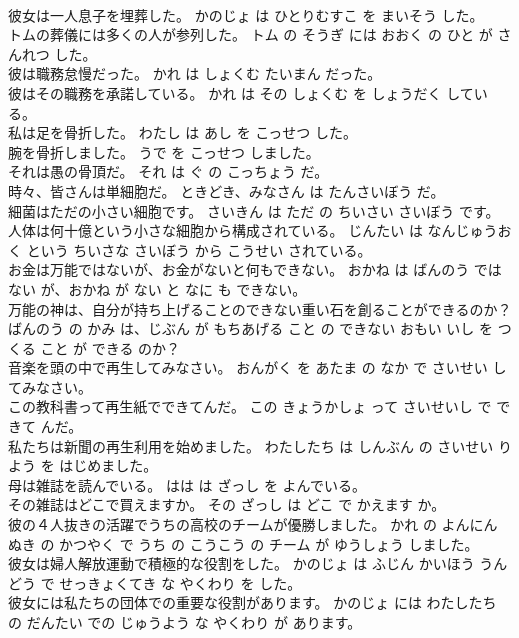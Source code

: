 \documentclass[8pt]{extreport}
\begin{document}
\begin{CJK}{UTF8}{min}
\\	彼女は一人息子を埋葬した。	かのじょ は ひとりむすこ を まいそう した。	
\\	トムの葬儀には多くの人が参列した。	トム の そうぎ には おおく の ひと が さんれつ した。	
\\	彼は職務怠慢だった。	かれ は しょくむ たいまん だった。	
\\	彼はその職務を承諾している。	かれ は その しょくむ を しょうだく している。	
\\	私は足を骨折した。	わたし は あし を こっせつ した。	
\\	腕を骨折しました。	うで を こっせつ しました。	
\\	それは愚の骨頂だ。	それ は ぐ の こっちょう だ。	
\\	時々、皆さんは単細胞だ。	ときどき、みなさん は たんさいぼう だ。	
\\	細菌はただの小さい細胞です。	さいきん は ただ の ちいさい さいぼう です。	
\\	人体は何十億という小さな細胞から構成されている。	じんたい は なんじゅうおく という ちいさな さいぼう から こうせい されている。	
\\	お金は万能ではないが、お金がないと何もできない。	おかね は ばんのう では ない が、おかね が ない と なに も できない。	
\\	万能の神は、自分が持ち上げることのできない重い石を創ることができるのか？	ばんのう の かみ は、じぶん が もちあげる こと の できない おもい いし を つくる こと が できる のか？	
\\	音楽を頭の中で再生してみなさい。	おんがく を あたま の なか で さいせい してみなさい。	
\\	この教科書って再生紙でできてんだ。	この きょうかしょ って さいせいし で できて んだ。	
\\	私たちは新聞の再生利用を始めました。	わたしたち は しんぶん の さいせい りよう を はじめました。	
\\	母は雑誌を読んでいる。	はは は ざっし を よんでいる。	
\\	その雑誌はどこで買えますか。	その ざっし は どこ で かえます か。	
\\	彼の４人抜きの活躍でうちの高校のチームが優勝しました。	かれ の よんにん ぬき の かつやく で うち の こうこう の チーム が ゆうしょう しました。	
\\	彼女は婦人解放運動で積極的な役割をした。	かのじょ は ふじん かいほう うんどう で せっきょくてき な やくわり を した。	
\\	彼女には私たちの団体での重要な役割があります。	かのじょ には わたしたち の だんたい での じゅうよう な やくわり が あります。	

\end{CJK}
\end{document}
